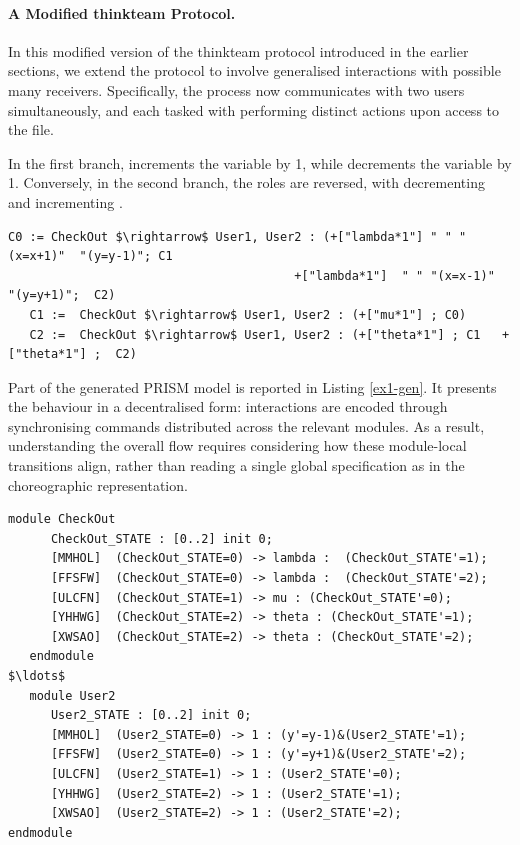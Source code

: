 \paragraph{A Modified thinkteam Protocol.}
In this modified version of the thinkteam protocol introduced in the earlier sections, we extend the protocol to involve generalised interactions with possible many receivers. Specifically, the  process now communicates with two users simultaneously,  and  each tasked with performing distinct actions upon access to the file. 

 In the first branch,  increments the variable  by 1, while  decrements the variable  by 1. Conversely, in the second branch, the roles are reversed, with  decrementing  and  incrementing .

 \begin{lstlisting}[style=chor-color,breaklines=true, postbreak=\mbox{\textcolor{red}{$\hookrightarrow$}\space},caption={Choreography for the Modified thinkteam Protocol},captionpos=b,label={ex1-chor}]
   C0 := CheckOut $\rightarrow$ User1, User2 : (+["lambda*1"] " " "(x=x+1)"  "(y=y-1)"; C1
                                       	+["lambda*1"]  " " "(x=x-1)"  "(y=y+1)";  C2)
   C1 :=  CheckOut $\rightarrow$ User1, User2 : (+["mu*1"] ; C0)  
   C2 :=  CheckOut $\rightarrow$ User1, User2 : (+["theta*1"] ; C1   +["theta*1"] ;  C2)
 \end{lstlisting}

 Part of the generated PRISM model is reported in Listing \ref{ex1-gen}. 
It presents the behaviour in a decentralised form: 
interactions are encoded through synchronising commands distributed across the relevant modules. 
As a result, understanding the overall flow requires considering 
how these module-local transitions align, 
rather than reading a single global specification as in the choreographic representation.
\begin{lstlisting}[style=prism-color,caption={Part of the generated PRISM model for the Modified thinkteam Protocol},captionpos=b,label={ex1-gen}]
   module CheckOut
      CheckOut_STATE : [0..2] init 0;
      [MMHOL]  (CheckOut_STATE=0) -> lambda :  (CheckOut_STATE'=1);
      [FFSFW]  (CheckOut_STATE=0) -> lambda :  (CheckOut_STATE'=2);
      [ULCFN]  (CheckOut_STATE=1) -> mu : (CheckOut_STATE'=0);
      [YHHWG]  (CheckOut_STATE=2) -> theta : (CheckOut_STATE'=1);
      [XWSAO]  (CheckOut_STATE=2) -> theta : (CheckOut_STATE'=2);
   endmodule
$\ldots$
   module User2
      User2_STATE : [0..2] init 0;
      [MMHOL]  (User2_STATE=0) -> 1 : (y'=y-1)&(User2_STATE'=1);
      [FFSFW]  (User2_STATE=0) -> 1 : (y'=y+1)&(User2_STATE'=2);
      [ULCFN]  (User2_STATE=1) -> 1 : (User2_STATE'=0);
      [YHHWG]  (User2_STATE=2) -> 1 : (User2_STATE'=1);
      [XWSAO]  (User2_STATE=2) -> 1 : (User2_STATE'=2);
endmodule
\end{lstlisting}



